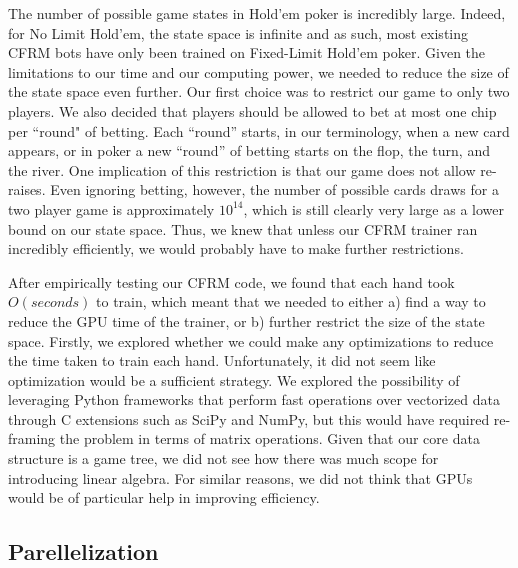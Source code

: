 \documentclass[11pt]{article}
\begin{document}
The number of possible game states in Hold'em poker is incredibly large. Indeed, for No Limit Hold'em, the state space is infinite and as such, most existing CFRM bots have only been trained on Fixed-Limit Hold'em poker. Given the limitations to our time and our computing power, we needed to reduce the size of the state space even further. Our first choice was to restrict our game to only two players. We also decided that players should be allowed to bet at most one chip per ``round" of betting. Each ``round'' starts, in our terminology, when a new card appears, or in poker a new ``round'' of betting starts on the flop, the turn, and the river. One implication of this restriction is that our game does not allow re-raises. Even ignoring betting, however, the number of possible cards draws for a two player game is approximately $10^{14}$, which is still clearly very large as a lower bound on our state space. Thus, we knew that unless our CFRM trainer ran incredibly efficiently, we would probably have to make further restrictions. 

After empirically testing our CFRM code, we found that each hand took $O(seconds)$ to train, which meant that we needed to either a) find a way to reduce the GPU time of the trainer, or b) further restrict the size of the state space. Firstly, we explored whether we could make any optimizations to reduce the time taken to train each hand. Unfortunately, it did not seem like optimization would be a sufficient strategy. We explored the possibility of leveraging Python frameworks that perform fast operations over vectorized data through C extensions such as SciPy and NumPy, but this would have required re-framing the problem in terms of matrix operations. Given that our core data structure is a game tree, we did not see how there was much scope for introducing linear algebra. For similar reasons, we did not think that GPUs would be of particular help in improving efficiency. 

\subsection{Parellelization}
\end{document}
